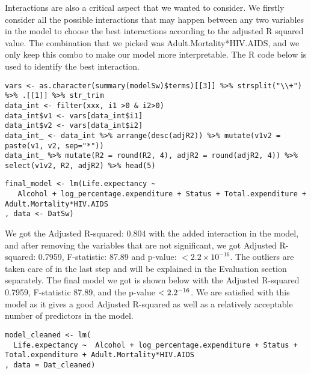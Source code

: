 Interactions are also a critical aspect that we wanted to consider. We firstly consider all the possible interactions that may happen between any two variables in the model to choose the best interactions according to the adjusted R squared value. The combination that we picked was Adult.Mortality*HIV.AIDS, and we only keep this combo to make our model more interpretable. The R code below is used to identify the best interaction.

\begin{verbatim}
vars <- as.character(summary(modelSw)$terms)[[3]] %>% strsplit("\\+") %>% .[[1]] %>% str_trim
data_int <- filter(xxx, i1 >0 & i2>0)
data_int$v1 <- vars[data_int$i1]
data_int$v2 <- vars[data_int$i2]
data_int_ <- data_int %>% arrange(desc(adjR2)) %>% mutate(v1v2 = paste(v1, v2, sep="*")) 
data_int_ %>% mutate(R2 = round(R2, 4), adjR2 = round(adjR2, 4)) %>% select(v1v2, R2, adjR2) %>% head(5) 
\end{verbatim}

\begin{verbatim}
final_model <- lm(Life.expectancy ~ 
   Alcohol + log_percentage.expenditure + Status + Total.expenditure + Adult.Mortality*HIV.AIDS
, data <- DatSw)
\end{verbatim}

We got the Adjusted R-squared: 0.804 with the added interaction in the model, and after removing the variables that are not significant, we got Adjusted R-squared: 0.7959, F-statistic: 87.89 and p-value: $< 2.2\times 10^{-16}$. The outliers are taken care of in the last step and will be explained in the Evaluation section separately. The final model we got is shown below with the Adjusted R-squared 0.7959, F-statistic 87.89, and the p-value $< 2.2\time 10^{-16}$. We are satisfied with this model as it gives a good Adjusted R-squared as well as a relatively acceptable number of predictors in the model.

\begin{verbatim}
model_cleaned <- lm(
  Life.expectancy ~  Alcohol + log_percentage.expenditure + Status + Total.expenditure + Adult.Mortality*HIV.AIDS
, data = Dat_cleaned)
\end{verbatim}

